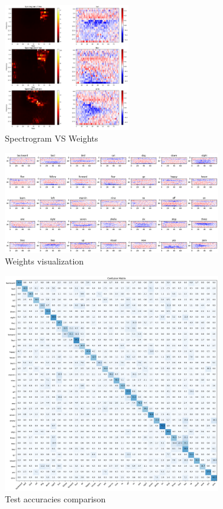 \documentclass{article}
\begin{document}
\begin{multicols}{2}
    \begin{figure}[H]
        \centering
        \includegraphics[width=0.48\textwidth]{spec_vs_weights.png}
        \caption{\small Spectrogram VS Weights}
        \label{fig:spec_vs_weights}
    \end{figure}

\end{multicols}

        \begin{figure}[H]
            \centering
            \includegraphics[width=0.83\textwidth]{weights.png}
            \caption{\small Weights visualization}
            \label{fig:weights}
        \end{figure}

        \begin{figure}[H]
            \centering
            \includegraphics[width=0.83\textwidth]{confmat.png}
            \caption{\small Test accuracies comparison}
            \label{fig:confmat}
        \end{figure}
\end{document}
